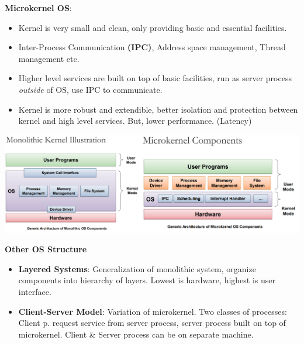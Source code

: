 \documentclass[10pt, landscape]{article}
\begin{document}
\begin{multicols*}{3}
\textbf{Microkernel OS}: 
\begin{itemize}
\item Kernel is very small and clean, only providing basic and essential facilities.
\item Inter-Process Communication \textbf{(IPC)}, Address space management, Thread management etc.
\item Higher level services are built on top of basic facilities, run as server process \textit{outside} of OS, use IPC to communicate.
\item Kernel is more robust and extendible, better isolation and protection between kernel and high level services. But, lower performance. (Latency)
\end{itemize}
\centerline{\includegraphics[width=0.95\linewidth]{OSstructure}}

\textbf{Other OS Structure}
\begin{itemize}
\item \textbf{Layered Systems}: Generalization of monolithic system, organize components into hierarchy of layers. Lowest is hardware, highest is user interface.
\item \textbf{Client-Server Model}: Variation of microkernel. Two classes of processes: Client p. request service from server process, server process built on top of microkernel. Client \& Server process can be on separate machine.
\end{itemize}


\end{multicols*}
\end{document}

